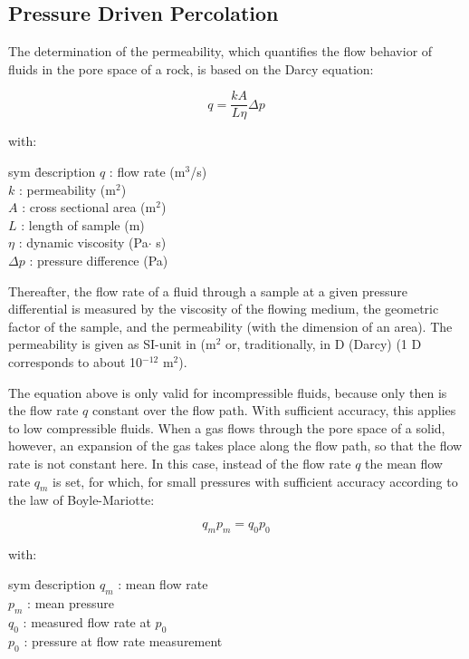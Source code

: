 \subsection{Pressure Driven Percolation}

The determination of the permeability, which quantifies the flow behavior of fluids in the pore space of a rock, is based on the Darcy equation:

\begin{equation}
q = \frac{kA}{L\eta}\Delta p
\end{equation}

with:
\begin{tabbing}
sym \= description \kill
$q$ : \> flow rate (m$^3$/s) \\
$k$ : \> permeability (m$^2$) \\
$A$ : \> cross sectional area (m$^2$) \\
$L$ : \> length of sample (m) \\
$\eta$ : \> dynamic viscosity (Pa$\cdot$ s) \\
$\Delta p$ : \> pressure difference (Pa)
\end{tabbing}

Thereafter, the flow rate of a fluid through a sample at a given pressure differential is measured by the viscosity of the flowing medium, the geometric factor of the sample, and the permeability (with the dimension of an area). The permeability is given as SI-unit in (m$^2$ or, traditionally, in D (Darcy) (1 D corresponds to about 10$^{-12}$ m$^2$).

The equation above is only valid for incompressible fluids, because only then is the flow rate $q$ constant over the flow path. With sufficient accuracy, this applies to low compressible fluids.
When a gas flows through the pore space of a solid, however, an expansion of the gas takes place along the flow path, so that the flow rate is not constant here. In this case, instead of the flow rate $q$ the mean flow rate $q_m$ is set, for which, for small pressures with sufficient accuracy according to the law of Boyle-Mariotte:

\begin{equation}
q_m p_m = q_0 p_0
\end{equation}

with:
\begin{tabbing}
sym \= description \kill
$q_m$ : \> mean flow rate \\
$p_m$ : \> mean pressure \\
$q_0$ : \> measured flow rate at $p_0$ \\
$p_0$ : \> pressure at flow rate measurement 
\end{tabbing}

